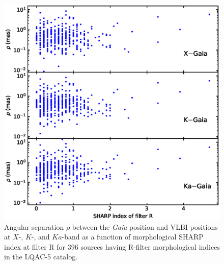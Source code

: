 \documentclass{aa-note}   %
\begin{document}
\begin{figure}[hbtp]
    \centering
    \includegraphics[width=\columnwidth]{figs/rho-I1R}
    \caption[]{\label{fig:rho-I1R}
        Angular separation $\rho$ between the {\it Gaia} position and VLBI positions at $X$-, $K$-, and $Ka$-band as a function of morphological SHARP index at filter R for 396 sources having R-filter morphological indices in the LQAC-5 catalog.
    }
\end{figure}
\end{document}
